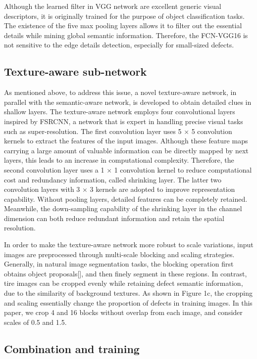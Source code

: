 \documentclass{article}
\begin{document}
Although the learned filter in VGG network are excellent generic visual descriptors, it is originally trained for the purpose of object classification tasks. The existence of the five max pooling layers allows it to filter out the essential details while mining global semantic information. Therefore, the FCN-VGG16 is not sensitive to the edge details detection, especially for small-sized defects.

\subsection{Texture-aware sub-network}
\label{Texture-aware sub-network}
As mentioned above, to address this issue, a novel texture-aware network, in parallel with the semantic-aware network, is developed to obtain detailed clues in shallow layers. The texture-aware network employs four convolutional layers inspired by FSRCNN\cite{dong2016accelerating}, a network that is expert in handling precise visual tasks such as super-resolution. The first convolution layer uses 5 $\times$ 5 convolution kernels to extract the features of the input images. Although these feature maps carrying a large amount of valuable information can be directly mapped by next layers, this leads to an increase in computational complexity. Therefore, the second convolution layer uses a 1 $\times$ 1 convolution kernel to reduce computational cost and redundancy information, called shrinking layer. The latter two convolution layers with 3 $\times$ 3 kernels are adopted to improve representation capability. Without pooling layers, detailed features can be completely retained. Meanwhile, the down-sampling capability of the shrinking layer in the channel dimension can both reduce redundant information and retain the spatial resolution.

In order to make the texture-aware network more robust to scale variations, input images are preprocessed through multi-scale blocking and scaling strategies. Generally, in natural image segmentation tasks, the blocking operation first obtains object proposals[], and then finely segment in these regions. In contrast, tire images can be cropped evenly while retaining defect semantic information, due to the similarity of background textures. As shown in Figure 1c, the cropping and scaling essentially change the proportion of defects in training images. In this paper, we crop 4 and 16 blocks without overlap from each image, and consider scales of 0.5 and 1.5.


\subsection{Combination and training}
\label{Combination and training}
\end{document}
